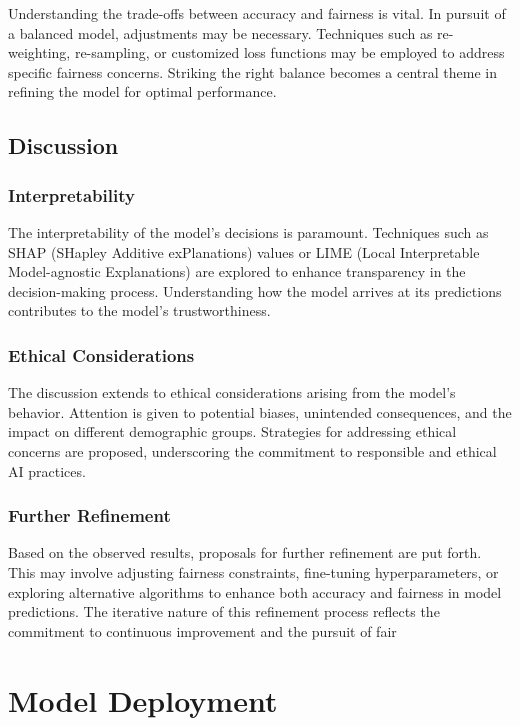 \documentclass[12pt,a4paper,openright,twoside]{book}
\begin{document}
Understanding the trade-offs between accuracy and fairness is vital. In pursuit of a balanced model, adjustments may be necessary. Techniques such as re-weighting, re-sampling, or customized loss functions may be employed to address specific fairness concerns. Striking the right balance becomes a central theme in refining the model for optimal performance.

\subsection{Discussion}

\subsubsection{Interpretability}

The interpretability of the model's decisions is paramount. Techniques such as SHAP (SHapley Additive exPlanations) values or LIME (Local Interpretable Model-agnostic Explanations) are explored to enhance transparency in the decision-making process. Understanding how the model arrives at its predictions contributes to the model's trustworthiness.

\subsubsection{Ethical Considerations}

The discussion extends to ethical considerations arising from the model's behavior. Attention is given to potential biases, unintended consequences, and the impact on different demographic groups. Strategies for addressing ethical concerns are proposed, underscoring the commitment to responsible and ethical AI practices.

\subsubsection{Further Refinement}

Based on the observed results, proposals for further refinement are put forth. This may involve adjusting fairness constraints, fine-tuning hyperparameters, or exploring alternative algorithms to enhance both accuracy and fairness in model predictions. The iterative nature of this refinement process reflects the commitment to continuous improvement and the pursuit of fair

\section{Model Deployment}
\label{section:model-deployment}
\end{document}

